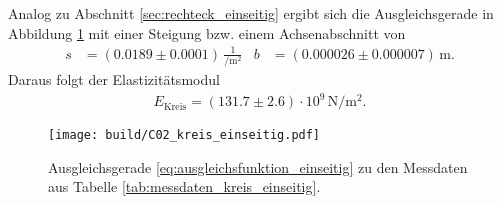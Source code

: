 \noindent
Analog zu Abschnitt \ref{sec:rechteck_einseitig} ergibt sich die Ausgleichsgerade in Abbildung \ref{fig:plot_kreis_einseitig}
mit einer Steigung bzw. einem Achsenabschnitt von 
\begin{align*}
    s &= (\num{0.0189} \pm \num{0.0001}) \, \frac{1}{\unit{\per\meter^2}} & b &= (\num{0.000026} \pm \num{0.000007}) \, \unit{\meter}.
\end{align*}
Daraus folgt der Elastizitätsmodul
\begin{align}
    E_\text{Kreis} = (\num{131.7} \pm \num{2.6}) \cdot 10^9 \, \unit{\newton\per\meter^2}.
\end{align}

\begin{figure}[H]
    \centering
    \texttt{[image: build/C02\_kreis\_einseitig.pdf]}
    \caption{Ausgleichsgerade \eqref{eq:ausgleichsfunktion_einseitig} zu den Messdaten aus Tabelle \ref{tab:messdaten_kreis_einseitig}.}
    \label{fig:plot_kreis_einseitig}
\end{figure}